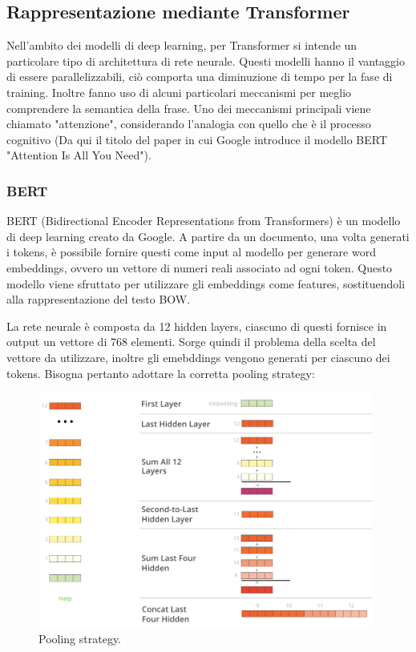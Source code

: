 \documentclass[oneside]{book}
\begin{document}
\subsection{Rappresentazione mediante Transformer}
Nell'ambito dei modelli di deep learning, per Transformer si intende un particolare tipo di architettura di rete neurale. Questi modelli hanno il vantaggio di essere parallelizzabili, ciò comporta una diminuzione di tempo per la fase di training. Inoltre fanno uso di alcuni particolari meccanismi  per meglio comprendere la semantica della frase\cite{transformer}. Uno dei meccanismi principali viene chiamato "attenzione", considerando l'analogia con quello che è il processo cognitivo (Da qui il titolo del paper in cui Google introduce il modello BERT "Attention Is All You Need"\cite{bert}).

\subsubsection{BERT}
BERT (Bidirectional Encoder Representations from Transformers) è un modello di deep learning creato da Google. A partire da un documento, una volta generati i tokens, è possibile fornire questi come input al modello per generare word embeddings, ovvero un vettore di numeri reali associato ad ogni token. Questo modello viene sfruttato per utilizzare gli embeddings come features, sostituendoli alla rappresentazione del testo BOW.

La rete neurale è composta da 12 hidden layers, ciascuno di questi fornisce in output un vettore di 768 elementi. Sorge quindi il problema della scelta del vettore da utilizzare, inoltre gli emebddings vengono generati per ciascuno dei tokens. Bisogna pertanto adottare la corretta pooling strategy:

\begin{figure}[!h]
	\centering
	\includegraphics[width=11cm]{assets/pooling-strategy.png}
	\caption[Caption for LOF]{Pooling strategy. \cite{transformer}}
\end{figure}
\end{document}
